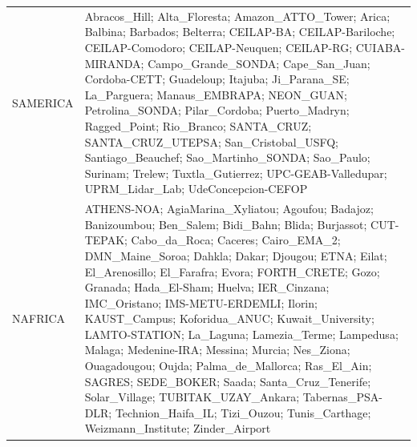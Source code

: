 \documentclass[journal abbreviation, manuscript]{copernicus}
\begin{document}
\begin{table}
\begin{tabularx}{\textwidth}{lX}
  SAMERICA  & Abracos\_Hill; Alta\_Floresta; Amazon\_ATTO\_Tower; Arica; Balbina; Barbados; Belterra; CEILAP-BA; CEILAP-Bariloche; CEILAP-Comodoro; CEILAP-Neuquen; CEILAP-RG; CUIABA-MIRANDA; Campo\_Grande\_SONDA; Cape\_San\_Juan; Cordoba-CETT; Guadeloup; Itajuba; Ji\_Parana\_SE; La\_Parguera; Manaus\_EMBRAPA; NEON\_GUAN; Petrolina\_SONDA; Pilar\_Cordoba; Puerto\_Madryn; Ragged\_Point; Rio\_Branco; SANTA\_CRUZ; SANTA\_CRUZ\_UTEPSA; San\_Cristobal\_USFQ; Santiago\_Beauchef; Sao\_Martinho\_SONDA; Sao\_Paulo; Surinam; Trelew; Tuxtla\_Gutierrez; UPC-GEAB-Valledupar; UPRM\_Lidar\_Lab; UdeConcepcion-CEFOP                                                                                                                                                                                                                                                                                                                                                                                                                                                                                                                                                                                                                                                                                                                                                                                                                                               \\
  NAFRICA   & ATHENS-NOA; AgiaMarina\_Xyliatou; Agoufou; Badajoz; Banizoumbou; Ben\_Salem; Bidi\_Bahn; Blida; Burjassot; CUT-TEPAK; Cabo\_da\_Roca; Caceres; Cairo\_EMA\_2; DMN\_Maine\_Soroa; Dahkla; Dakar; Djougou; ETNA; Eilat; El\_Arenosillo; El\_Farafra; Evora; FORTH\_CRETE; Gozo; Granada; Hada\_El-Sham; Huelva; IER\_Cinzana; IMC\_Oristano; IMS-METU-ERDEMLI; Ilorin; KAUST\_Campus; Koforidua\_ANUC; Kuwait\_University; LAMTO-STATION; La\_Laguna; Lamezia\_Terme; Lampedusa; Malaga; Medenine-IRA; Messina; Murcia; Nes\_Ziona; Ouagadougou; Oujda; Palma\_de\_Mallorca; Ras\_El\_Ain; SAGRES; SEDE\_BOKER; Saada; Santa\_Cruz\_Tenerife; Solar\_Village; TUBITAK\_UZAY\_Ankara; Tabernas\_PSA-DLR; Technion\_Haifa\_IL; Tizi\_Ouzou; Tunis\_Carthage; Weizmann\_Institute; Zinder\_Airport                                                                                                                                                                                                                                                                                                                                                                                                                                                                                                                                                                                                                                                                 \\

\end{tabularx}
\end{table}
\end{document}
